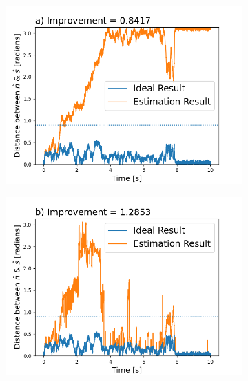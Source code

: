 \documentclass[final, 3p]{elsarticle}
\begin{document}
\begin{figure}[h]
	
	\centering
	\begin{subfigure}{0.32\textwidth}
		\includegraphics[width=\textwidth]{./Images/fig5a.png}
	\end{subfigure}
	\begin{subfigure}{0.32\textwidth}
		\includegraphics[width=\textwidth]{./Images/fig5b.png}
	\end{subfigure}
	\begin{subfigure}{0.32\textwidth}

\end{subfigure}
\end{figure}
\end{document}
